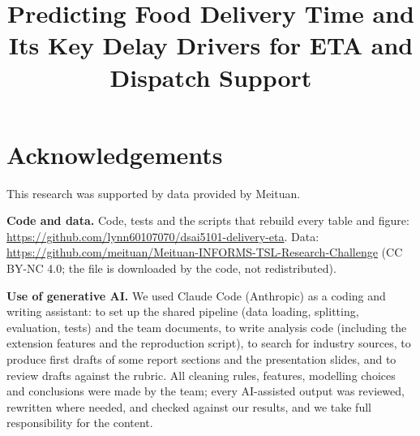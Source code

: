 \documentclass[conference]{IEEEtran}
\begin{document}
\title{Predicting Food Delivery Time and Its Key Delay Drivers for ETA and Dispatch Support}

\author{
}

\maketitle


\section*{Acknowledgements}
This research was supported by data provided by Meituan.  %

\textbf{Code and data.} Code, tests and the scripts that rebuild every table and figure:
\url{https://github.com/lynn60107070/dsai5101-delivery-eta}. Data: \url{https://github.com/meituan/Meituan-INFORMS-TSL-Research-Challenge}
(CC BY-NC 4.0; the file is downloaded by the code, not redistributed).

\textbf{Use of generative AI.} %
We used Claude Code (Anthropic) as a coding and writing assistant: to set up the shared pipeline
(data loading, splitting, evaluation, tests) and the team documents, to write analysis code (including the
extension features and the reproduction script), to search for industry sources, to produce first
drafts of some report sections and the presentation slides, and to review drafts against the rubric. All cleaning rules, features, modelling choices and conclusions were made by the team;
every AI-assisted output was reviewed, rewritten where needed, and checked against our results, and we
take full responsibility for the content.




\clearpage
\appendices
\end{document}
